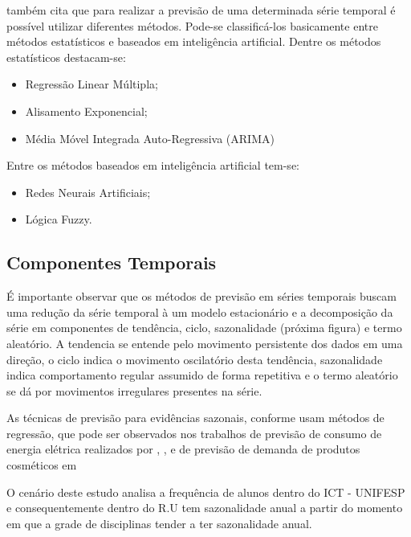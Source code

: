 \documentclass[	12pt, Times, openright, twoside, a4paper, english, brazil]{abntex2}
\begin{document}
          \cite{Almeida2013} também cita que para realizar a previsão de uma determinada série temporal é possível utilizar diferentes métodos. Pode-se classificá-los basicamente entre métodos estatísticos e baseados em inteligência artificial.
          Dentre os métodos estatísticos destacam-se:
          \begin{itemize}
          \item Regressão Linear Múltipla;
          \item Alisamento Exponencial;
          \item Média Móvel Integrada Auto-Regressiva (ARIMA)
          \end{itemize}
          Entre os métodos baseados em inteligência artificial tem-se:
          \begin{itemize}
          \item Redes Neurais Artificiais;
          \item Lógica Fuzzy.
          \end{itemize}

        \subsection{Componentes Temporais}

          É importante observar que os métodos de previsão em séries temporais buscam uma redução da série temporal à um modelo estacionário e a decomposição da série em componentes de tendência, ciclo, sazonalidade (próxima figura) e termo aleatório. A tendencia se entende pelo movimento persistente dos dados em uma direção, o ciclo indica o movimento oscilatório desta tendência, sazonalidade indica comportamento regular assumido de forma repetitiva e o termo aleatório se dá por movimentos irregulares presentes na série.
           
          As técnicas de previsão para evidências sazonais, conforme  usam métodos de regressão, que pode ser observados nos trabalhos de previsão de consumo de energia elétrica realizados por \cite{Almeida2013}, \cite{RUAS2012}, \cite{Silva2010} e de previsão de demanda de produtos cosméticos em \cite{Junior2007}

          O cenário deste estudo analisa a frequência de alunos dentro do ICT - UNIFESP e consequentemente dentro do R.U tem sazonalidade anual a partir do momento em que a grade de disciplinas tender a ter sazonalidade anual. \\
\end{document}
